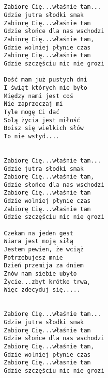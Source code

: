 \documentclass[12pt]{article}
\begin{document}
\subsection*{}
\begin{verbatim}
Zabiorę Cię...właśnie tam...
Gdzie jutra słodki smak
Zabiorę Cię...właśnie tam
Gdzie słońce dla nas wschodzi
Zabiorę Cię...właśnie tam,
Gdzie wolniej płynie czas
Zabiorę Cię...właśnie tam
Gdzie szczęściu nic nie grozi

Dość mam już pustych dni
I świąt których nie było
Między nami jest coś
Nie zaprzeczaj mi
Tyle mogę Ci dać
Solą życia jest miłość
Boisz się wielkich słów
To nie wstyd....


Zabiorę Cię...właśnie tam...
Gdzie jutra słodki smak
Zabiorę Cię...właśnie tam,
Gdzie słońce dla nas wschodzi
Zabiorę Cię...właśnie tam
Gdzie wolniej płynie czas
Zabiorę Cię...właśnie tam
Gdzie szczęściu nic nie grozi

Czekam na jeden gest
Wiara jest moją siłą
Jestem pewien, że wciąż
Potrzebujesz mnie
Dzień przemija za dniem
Znów nam siebie ubyło
Życie...zbyt krótko trwa,
Więc zdecyduj się.....


Zabiorę Cię...właśnie tam...
Gdzie jutra słodki smak
Zabiorę Cię...właśnie tam
Gdzie słońce dla nas wschodzi
Zabiorę Cię...właśnie tam,
Gdzie wolniej płynie czas
Zabiorę Cię...własnie tam
Gdzie szczęściu nic nie grozi
\end{verbatim}
\clearpage
\end{document}
